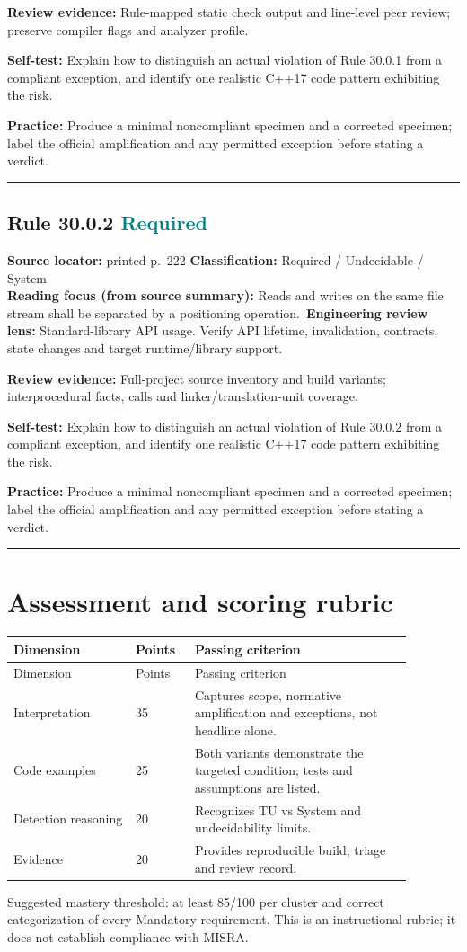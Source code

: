 \documentclass[10pt,letterpaper]{article}
\begin{document}
\textbf{Review evidence:} Rule-mapped static check output and line-level peer review; preserve compiler flags and analyzer profile.

\textbf{Self-test:} Explain how to distinguish an actual violation of Rule 30.0.1 from a compliant exception, and identify one realistic C++17 code pattern exhibiting the risk.\par
\textbf{Practice:} Produce a minimal noncompliant specimen and a corrected specimen; label the official amplification and any permitted exception before stating a verdict.
\smallskip\hrule\smallskip
\subsection*{Rule 30.0.2 \enspace \texorpdfstring{\small\textcolor{teal}{Required}}{Required}}
\noindent\textbf{Source locator:} printed p.~222 \quad\textbf{Classification:} Required / Undecidable / System\\
\textbf{Reading focus (from source summary):} Reads and writes on the same file stream shall be separated by a positioning operation.\
\textbf{Engineering review lens:} Standard-library API usage. Verify API lifetime, invalidation, contracts, state changes and target runtime/library support.

\textbf{Review evidence:} Full-project source inventory and build variants; interprocedural facts, calls and linker/translation-unit coverage.

\textbf{Self-test:} Explain how to distinguish an actual violation of Rule 30.0.2 from a compliant exception, and identify one realistic C++17 code pattern exhibiting the risk.\par
\textbf{Practice:} Produce a minimal noncompliant specimen and a corrected specimen; label the official amplification and any permitted exception before stating a verdict.
\smallskip\hrule\smallskip

\section{Assessment and scoring rubric}
\small\setlength{\tabcolsep}{3pt}\renewcommand{\arraystretch}{1.15}
\begin{longtable}{p{0.27\linewidth}p{0.13\linewidth}p{0.48\linewidth}}
\toprule
Dimension & Points & Passing criterion\\ \midrule
\endfirsthead
\toprule
Dimension & Points & Passing criterion\\ \midrule
\endhead
Interpretation & 35 & Captures scope, normative amplification and exceptions, not headline alone.\\
Code examples & 25 & Both variants demonstrate the targeted condition; tests and assumptions are listed.\\
Detection reasoning & 20 & Recognizes TU vs System and undecidability limits.\\
Evidence & 20 & Provides reproducible build, triage and review record.\\
\bottomrule
\end{longtable}
\normalsize
Suggested mastery threshold: at least 85/100 per cluster and correct categorization of every Mandatory requirement. This is an instructional rubric; it does not establish compliance with MISRA.
\end{document}
